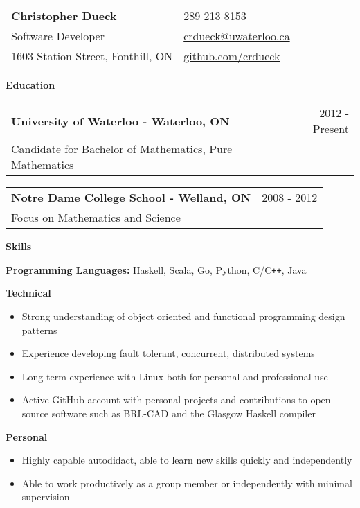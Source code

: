 \documentclass[10pt]{article}
\makeatletter
\newcommand{\resheader}[6]{\
\begin{tabular*}{7in}{l@{\extracolsep{\fill}}l}
    \textbf{\huge #1} & {\large #2}
    \vspace{4pt} \\
    {\large #3} & {\large #4}
    \vspace{4pt} \\
    {\large #5} & {\large #6}
\end{tabular*}\vspace{4pt}}
\newcommand{\resheading}[1]{{\large \colorbox{headercol}{\begin{minipage}{\textwidth}{\textbf{#1 \vphantom{p\^{E}}}}\end{minipage}}}}
\newcommand{\ressubheading}[3]{\item
\begin{tabular*}{7in}{l@{\extracolsep{\fill}}r}
    \textbf{#1} & #2 \\ #3
\end{tabular*}\vspace{-4pt}}
\newcommand{\resitem}[2]{\item{\textbf{#1} #2}}
\newcommand{\phone}{{\Large\faPhone} 289 213 8153}
\newcommand{\email}{{\Large\faEnvelope} \href{mailto:crdueck@uwaterloo.ca}{crdueck@uwaterloo.ca}}
\newcommand{\github}{{\Large\faGithub} \href{https://github.com/crdueck}{github.com/crdueck}}
\makeatother
\begin{document}
\resheader
    {Christopher Dueck}                    \phone
    {Software Developer}                   \email
    {1603 Station Street, Fonthill, ON}    \github

\resheading{Education}
\begin{description}
    \ressubheading{University of Waterloo - Waterloo, ON} {2012 - Present}
    {Candidate for Bachelor of Mathematics, Pure Mathematics}
    \ressubheading{Notre Dame College School - Welland, ON} {2008 - 2012}
    {Focus on Mathematics and Science}
\end{description}

\resheading{Skills}
\begin{description}
    \resitem{Programming Languages:} {Haskell, Scala, Go, Python, C/C\texttt{++}, Java}
    \resitem{Technical}{\vspace{-4pt}
    \begin{itemize}
            \item{Strong understanding of object oriented and functional programming design patterns}
            \item{Experience developing fault tolerant, concurrent, distributed systems}
            \item{Long term experience with Linux both for personal and professional use}
            \item{Active GitHub account with personal projects and contributions to open source software such as BRL-CAD and the Glasgow Haskell compiler}
    \end{itemize}}
    \resitem{Personal}{\vspace{-4pt}
    \begin{itemize}
        \item{Highly capable autodidact, able to learn new skills quickly and independently}
        \item{Able to work productively as a group member or independently with minimal supervision}
    \end{itemize}}
\end{description}
\end{document}
